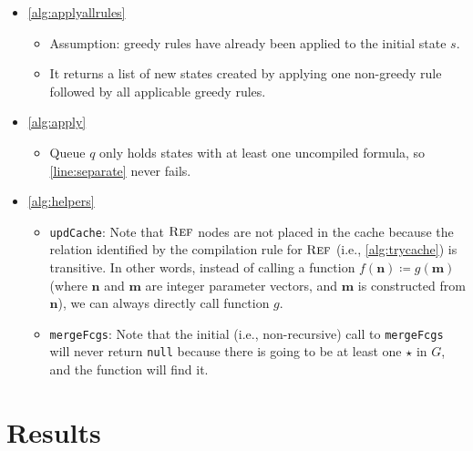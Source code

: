 \begin{itemize}
\item \cref{alg:applyallrules}
\begin{itemize}
\item Assumption: greedy rules have already been applied to the initial state $s$.
\item It returns a list of new states created by applying one non-greedy rule followed by all applicable greedy rules.
\end{itemize}
\item \cref{alg:apply}
\begin{itemize}
\item Queue $q$ only holds states with at least one uncompiled formula, so \cref{line:separate} never fails.
\end{itemize}
\item \cref{alg:helpers}
\begin{itemize}
\item \texttt{updCache}: Note that $\operatorname{\textsc{Ref}}$ nodes are not placed in the cache because the relation identified by the compilation rule for $\operatorname{\textsc{Ref}}$ (i.e., \cref{alg:trycache}) is transitive. In other words, instead of calling a function $f(\mathbf{n}) \coloneqq g(\mathbf{m})$ (where $\mathbf{n}$ and $\mathbf{m}$ are integer parameter vectors, and $\mathbf{m}$ is constructed from $\mathbf{n}$), we can always directly call function $g$.
\item \texttt{mergeFcgs}: Note that the initial (i.e., non-recursive) call to \texttt{mergeFcgs} will never return \texttt{null} because there is going to be at least one $\star$ in $G$, and the function will find it.
\end{itemize}
\end{itemize}

\section{Results} %

